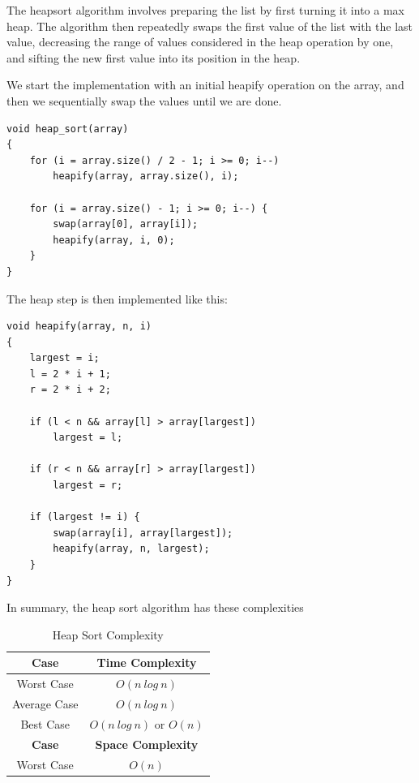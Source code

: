 \documentclass{article}
\begin{document}
The heapsort algorithm involves preparing the list by first turning it into a max heap. The algorithm then repeatedly swaps the first value of the list with the last value, decreasing the range of values considered in the heap operation by one, and sifting the new first value into its position in the heap.

We start the implementation with an initial heapify operation on the array, and then we sequentially swap the values until we are done.

\begin{lstlisting}
void heap_sort(array)
{
	for (i = array.size() / 2 - 1; i >= 0; i--)
	    heapify(array, array.size(), i);

	for (i = array.size() - 1; i >= 0; i--) {
	    swap(array[0], array[i]);
	    heapify(array, i, 0);
	}
}
\end{lstlisting}

The heap step is then implemented like this:

\begin{lstlisting}
void heapify(array, n, i)
{
	largest = i;
	l = 2 * i + 1;
	r = 2 * i + 2;

	if (l < n && array[l] > array[largest])
	    largest = l;

	if (r < n && array[r] > array[largest])
	    largest = r;

	if (largest != i) {
	    swap(array[i], array[largest]);
	    heapify(array, n, largest);
	}
}
\end{lstlisting}

In summary, the heap sort algorithm has these complexities

\begin{table}[H]
  \begin{center}
    \label{tab:Heap Sort Complexity}
    \begin{tabular}{c|c}
      \toprule
      \textbf{Case} & \textbf{Time Complexity} \\
      \midrule
      Worst Case & $O(n\ log\ n)$ \\
      Average Case & $O(n\ log\ n)$ \\
      Best Case & $O(n\ log\ n)$ or $O(n)$ \\
      \bottomrule
      \toprule
      \textbf{Case} & \textbf{Space Complexity} \\
      \midrule
      Worst Case & $O(n)$ \\
    \end{tabular}
    \caption{Heap Sort Complexity}
  \end{center}
\end{table}
\end{document}
